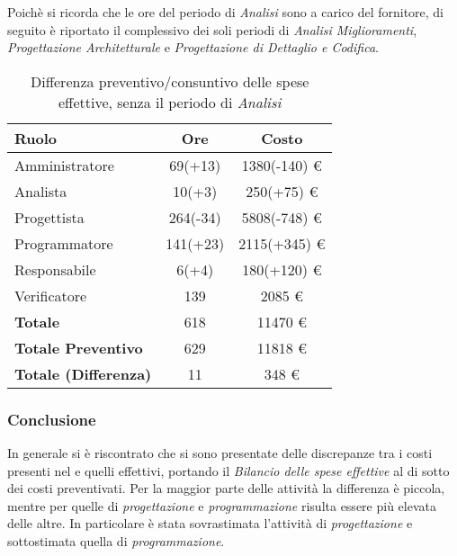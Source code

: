 Poich\`e si ricorda che le ore del periodo di \textit{Analisi} sono a carico del fornitore, di seguito \`e riportato il  complessivo dei soli periodi di \textit{Analisi Miglioramenti}, \textit{Progettazione Architetturale} e \textit{Progettazione di Dettaglio e Codifica}.

\begin{table}[H]
	\centering
	\begin{tabular}{ l c c }
		\textbf{Ruolo} & \textbf{Ore} & \textbf{Costo} \\
		\hline
		Amministratore & 69(+13) & 1380(-140) \euro{} \\
		Analista & 10(+3) & 250(+75) \euro{} \\
		Progettista & 264(-34) & 5808(-748) \euro{} \\
		Programmatore & 141(+23) & 2115(+345) \euro{} \\
		Responsabile & 6(+4) & 180(+120) \euro{} \\
		Verificatore & 139 & 2085 \euro{} \\
		\hline
		\textbf{Totale \glossaryItem{Consuntivo}} & 618 & 11470 \euro{} \\
		\hline
		\textbf{Totale Preventivo} & 629 & 11818 \euro{} \\
		\hline
		\textbf{Totale (Differenza)} & 11 & 348 \euro{} \\
		\hline
	\end{tabular}
	\caption{Differenza preventivo/consuntivo delle spese effettive, senza il periodo di \textit{Analisi}}
\end{table}




\subsubsection{Conclusione}
In generale si \`e riscontrato che si sono presentate delle discrepanze tra i costi presenti nel  e quelli effettivi, portando il \textit{Bilancio delle spese effettive} al di sotto dei costi preventivati. 
Per la maggior parte delle attivit\`a la differenza \`e piccola, mentre per quelle di \textit{progettazione} e \textit{programmazione} risulta essere pi\`u elevata delle altre.
In particolare \`e stata sovrastimata l'attivit\`a di \textit{progettazione} e sottostimata quella di \textit{programmazione}.






\newpage
